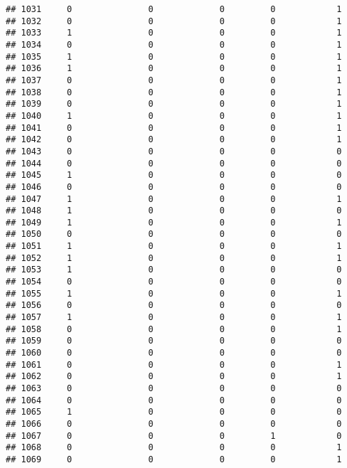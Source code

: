 \documentclass[]{article}
\begin{document}
\begin{verbatim}
## 1031     0               0             0         0            1
## 1032     0               0             0         0            1
## 1033     1               0             0         0            1
## 1034     0               0             0         0            1
## 1035     1               0             0         0            1
## 1036     1               0             0         0            1
## 1037     0               0             0         0            1
## 1038     0               0             0         0            1
## 1039     0               0             0         0            1
## 1040     1               0             0         0            1
## 1041     0               0             0         0            1
## 1042     0               0             0         0            1
## 1043     0               0             0         0            0
## 1044     0               0             0         0            0
## 1045     1               0             0         0            0
## 1046     0               0             0         0            0
## 1047     1               0             0         0            1
## 1048     1               0             0         0            0
## 1049     1               0             0         0            1
## 1050     0               0             0         0            0
## 1051     1               0             0         0            1
## 1052     1               0             0         0            1
## 1053     1               0             0         0            0
## 1054     0               0             0         0            0
## 1055     1               0             0         0            1
## 1056     0               0             0         0            0
## 1057     1               0             0         0            1
## 1058     0               0             0         0            1
## 1059     0               0             0         0            0
## 1060     0               0             0         0            0
## 1061     0               0             0         0            1
## 1062     0               0             0         0            1
## 1063     0               0             0         0            0
## 1064     0               0             0         0            0
## 1065     1               0             0         0            0
## 1066     0               0             0         0            0
## 1067     0               0             0         1            0
## 1068     0               0             0         0            1
## 1069     0               0             0         0            1

\end{verbatim}
\end{document}
